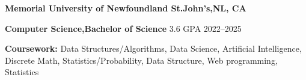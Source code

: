 \textbf{Memorial University of Newfoundland \hfill St.John's,NL, CA} \par
\textbf{Computer Science,Bachelor of Science} 3.6 GPA \hfill 2022--2025\par
\textbf{Coursework:} Data Structures/Algorithms, Data Science, Artificial Intelligence, Discrete Math, Statistics/Probability, Data Structure, Web programming, Statistics\par
